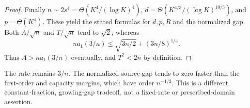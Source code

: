 \begin{proof}
Finally $n\sim2s^4=\Theta(K^4/(\log K)^4)$,
$d=\Theta(K^{4/3}/(\log K)^{10/3})$, and $p=\Theta(K^4)$.
These yield the stated formulas for $d,p,R$ and the normalized gap.
Both $A/\sqrt n$ and $T/\sqrt n$ tend to $\sqrt2$, whereas
\[
 n a_1(3/n)\le\sqrt{3n/2}+(3n/8)^{1/4}.
\]
Thus $A>n a_1(3/n)$ eventually, and $T^2<2n$ by definition.
\end{proof}

The rate remains $3/n$.  The normalized source gap tends to zero faster
than the first-order and capacity margins, which have order $n^{-1/2}$.
This is a different constant-fraction, growing-gap tradeoff, not a
fixed-rate or prescribed-domain assertion.
